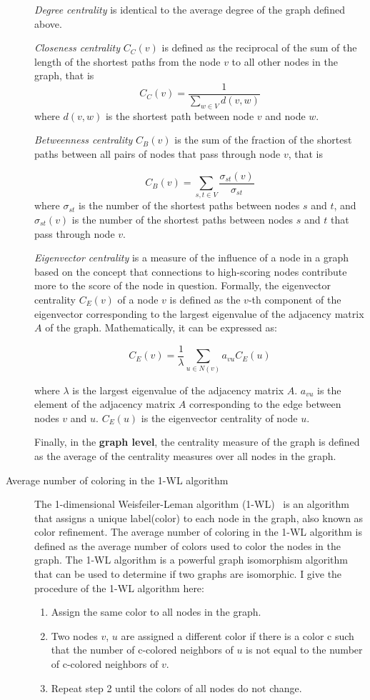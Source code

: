 \documentclass{article}
\begin{document}
\begin{description}
    \textit{Degree centrality} is identical to the average degree of the graph defined above. 
    
    \textit{Closeness centrality} $C_C(v)$ is defined as the reciprocal of the sum of the length of the shortest paths from the node $v$ to all other nodes in the graph, that is 
    $$C_C(v) = \frac{1}{\sum_{w\in V}{d(v ,w)}}$$
    where $d(v, w)$ is the shortest path between node $v$ and node $w$. 
    
    \textit{Betweenness centrality} $C_B(v)$ is the sum of the fraction of the shortest paths between all pairs of nodes that pass through node $v$, that is
    
    $$
        C_B(v) = \sum_{s,t \in V} \frac{\sigma_{st}(v)}{\sigma_{st}}
    $$
    where $\sigma_{st}$ is the number of the shortest paths between nodes $s$ and $t$, and $\sigma_{st}(v)$ is the number of the shortest paths between nodes $s$ and $t$ that pass through node $v$.
    
    \textit{Eigenvector centrality} is a measure of the influence of a node in a graph based on the concept that connections to high-scoring nodes contribute more to the score of the node in question. Formally, the eigenvector centrality $C_E(v)$ of a node $v$  is defined as the $v$-th component of the eigenvector corresponding to the largest eigenvalue of the adjacency matrix $A$ of the graph. Mathematically, it can be expressed as:
    
    \[ C_E(v) = \frac{1}{\lambda} \sum_{u \in N(v)} a_{vu} C_E(u) \]
    
    where $ \lambda$ is the largest eigenvalue of the adjacency matrix $A$.
$a_{vu}$ is the element of the adjacency matrix $A$ corresponding to the edge between nodes $v$  and $u$.
$ C_E(u)$  is the eigenvector centrality of node $u$.


    Finally, in the \textbf{graph level}, the centrality measure of the graph is defined as the average of the centrality measures over all nodes in the graph.

    \item [Average number of coloring in the 1-WL algorithm] 
    \sloppy
    The 1-dimensional Weisfeiler-Leman algorithm (1-WL)~\cite{weisfeiler1968reduction} is an algorithm that assigns a unique label(color) to each node in the graph, also known as color refinement. The average number of coloring in the 1-WL algorithm is defined as the average number of colors used to color the nodes in the graph. The 1-WL algorithm is a powerful graph isomorphism algorithm that can be used to determine if two graphs are isomorphic. I give the procedure of the 1-WL algorithm here:
    \begin{enumerate}
        \item Assign the same color to all nodes in the graph.
        \item Two nodes $v$, $u$ are assigned a different color if there is a color c such that the number of c-colored neighbors of $u$ is not equal to the number of c-colored neighbors of $v$.
        \item Repeat step 2 until the colors of all nodes do not change.
    \end{enumerate}
    

\end{description}
\end{document}

